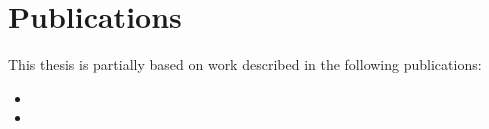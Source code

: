 \section*{Publications}
This thesis is partially based on work described in the following publications:
\nobibliography*
\begin{NoHyper} %
\begin{itemize}
    \item {}
    \item {}
\end{itemize}
\end{NoHyper}
\clearpage
